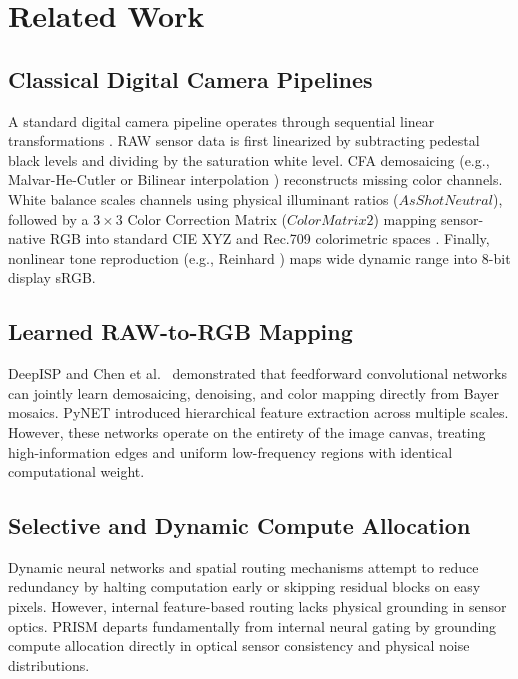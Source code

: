 \documentclass[10pt,twocolumn]{article}
\begin{document}
\section{Related Work}

\subsection{Classical Digital Camera Pipelines}
A standard digital camera pipeline operates through sequential linear transformations \cite{karaimer2016software, hesterstein2020revisiting}. RAW sensor data is first linearized by subtracting pedestal black levels and dividing by the saturation white level. CFA demosaicing (e.g., Malvar-He-Cutler or Bilinear interpolation \cite{malvar2004high}) reconstructs missing color channels. White balance scales channels using physical illuminant ratios ($AsShotNeutral$), followed by a $3 \times 3$ Color Correction Matrix ($ColorMatrix2$) mapping sensor-native RGB into standard CIE XYZ and Rec.709 colorimetric spaces \cite{ebner2007color}. Finally, nonlinear tone reproduction (e.g., Reinhard \cite{reinhard2002photographic}) maps wide dynamic range into 8-bit display sRGB.

\subsection{Learned RAW-to-RGB Mapping}
DeepISP \cite{schwartz2018deepisp} and Chen et al.\ \cite{chen2018learning} demonstrated that feedforward convolutional networks can jointly learn demosaicing, denoising, and color mapping directly from Bayer mosaics. PyNET \cite{ignatov2020pynet} introduced hierarchical feature extraction across multiple scales. However, these networks operate on the entirety of the image canvas, treating high-information edges and uniform low-frequency regions with identical computational weight.

\subsection{Selective and Dynamic Compute Allocation}
Dynamic neural networks and spatial routing mechanisms \cite{figurnov2017spatially, wang2018skipnet} attempt to reduce redundancy by halting computation early or skipping residual blocks on easy pixels. However, internal feature-based routing lacks physical grounding in sensor optics. PRISM departs fundamentally from internal neural gating by grounding compute allocation directly in optical sensor consistency and physical noise distributions.
\end{document}
